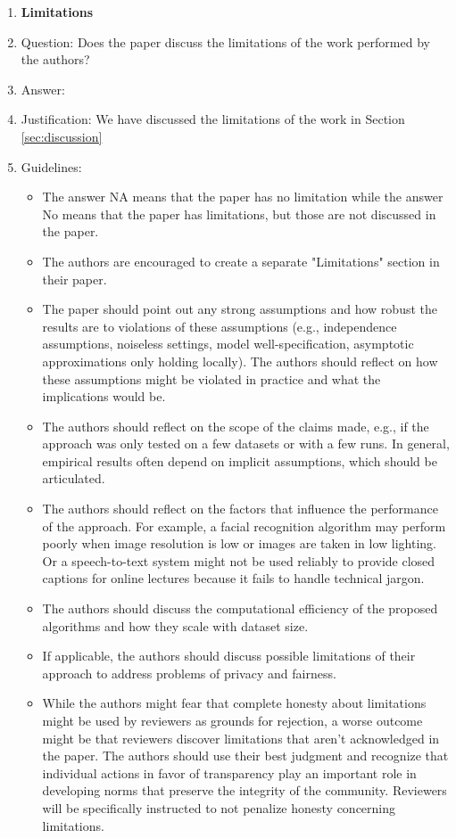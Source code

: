 \documentclass{article}
\begin{document}
\begin{enumerate}
\item {\bf Limitations}
    \item[] Question: Does the paper discuss the limitations of the work performed by the authors?
    \item[] Answer: \answerYes{} %
    \item[] Justification: We have discussed the limitations of the work in Section \ref{sec:discussion}
    \item[] Guidelines:
    \begin{itemize}
        \item The answer NA means that the paper has no limitation while the answer No means that the paper has limitations, but those are not discussed in the paper. 
        \item The authors are encouraged to create a separate "Limitations" section in their paper.
        \item The paper should point out any strong assumptions and how robust the results are to violations of these assumptions (e.g., independence assumptions, noiseless settings, model well-specification, asymptotic approximations only holding locally). The authors should reflect on how these assumptions might be violated in practice and what the implications would be.
        \item The authors should reflect on the scope of the claims made, e.g., if the approach was only tested on a few datasets or with a few runs. In general, empirical results often depend on implicit assumptions, which should be articulated.
        \item The authors should reflect on the factors that influence the performance of the approach. For example, a facial recognition algorithm may perform poorly when image resolution is low or images are taken in low lighting. Or a speech-to-text system might not be used reliably to provide closed captions for online lectures because it fails to handle technical jargon.
        \item The authors should discuss the computational efficiency of the proposed algorithms and how they scale with dataset size.
        \item If applicable, the authors should discuss possible limitations of their approach to address problems of privacy and fairness.
        \item While the authors might fear that complete honesty about limitations might be used by reviewers as grounds for rejection, a worse outcome might be that reviewers discover limitations that aren't acknowledged in the paper. The authors should use their best judgment and recognize that individual actions in favor of transparency play an important role in developing norms that preserve the integrity of the community. Reviewers will be specifically instructed to not penalize honesty concerning limitations.
    \end{itemize}


\end{enumerate}
\end{document}
